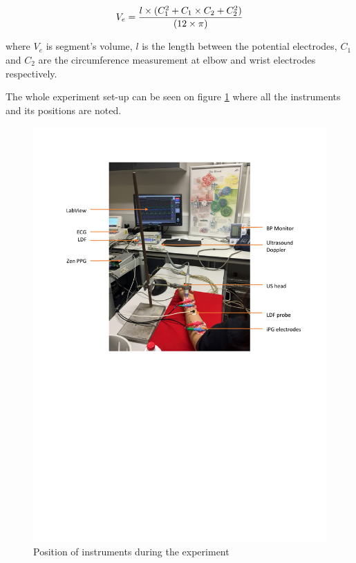 \begin{align}
	\label{eq:v_e}
	V_e =\frac{l \times (C_1^2+C_1 \times C_2 + C_2^2)}{(12 \times \pi)} \tagaddtext{[\si{\cubic\centi\meter}]}
\end{align}

where $V_e$ is segment's volume, $l$ is the length between the potential electrodes, $C_1$ and $C_2$ are the circumference measurement at elbow and wrist electrodes respectively.

The whole experiment set-up can be seen on figure \ref{fig:experimental set-up} where all the instruments and its positions are noted.

\begin{figure}[!htpb]
	\centering
	\includegraphics[width=15cm,keepaspectratio]{figure1}
	\caption{Position of instruments during the experiment}
	\label{fig:experimental set-up}
\end{figure}



